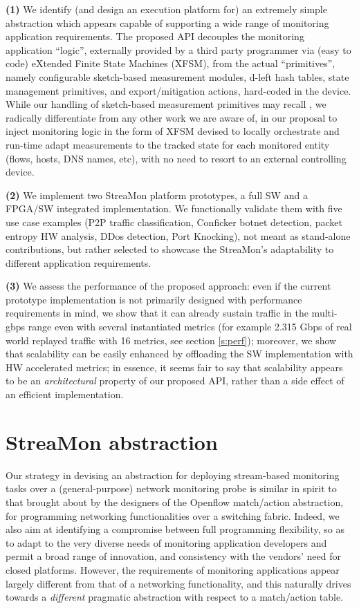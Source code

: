 \documentclass[conference,letterpaper]{sig-alternate-10pt}
\begin{document}
{\bf (1)} We identify (and design an execution platform for) an extremely simple abstraction which appears capable of supporting a wide range of monitoring application requirements. The proposed API decouples the monitoring application ``logic'', externally provided by a third party programmer via (easy to code) eXtended Finite State Machines (XFSM), from the actual ``primitives'', namely configurable sketch-based measurement modules, d-left hash tables, state management primitives, and export/mitigation actions, hard-coded in the device. While our handling of sketch-based measurement primitives may recall \cite{opensk}, we radically differentiate from any other work we are aware of, in our proposal to inject monitoring logic in the form of XFSM devised to locally orchestrate and run-time adapt measurements to the tracked state for each monitored entity (flows, hosts, DNS names, etc),
with no need to resort to an external controlling device.

{\bf (2)} We implement two StreaMon platform prototypes, a full SW and a FPGA/SW integrated implementation. We functionally validate them with five use case examples (P2P traffic classification, Conficker botnet detection, packet entropy HW analysis, DDos detection, Port Knocking), not meant as stand-alone contributions, but rather selected to showcase the StreaMon's adaptability to different application requirements. 

{\bf (3)} We assess the performance of the proposed approach: even if the current prototype implementation is not primarily designed with performance requirements in mind, we show that it can already sustain traffic in the multi-gbps range even with several instantiated metrics (for example 2.315 Gbps of real world replayed traffic with 16 metrics, see section \ref{s:perf}); moreover, we show that scalability can be easily enhanced by offloading the SW implementation with HW accelerated metrics; in essence, it seems fair to say that scalability appears to be an {\em architectural} property of our proposed API, rather than a side effect of an efficient implementation.




\section{StreaMon abstraction}
\label{s:abstraction}

Our strategy in devising an abstraction for deploying stream-based monitoring tasks over a (general-purpose) network monitoring probe is similar in spirit to that brought about by the designers of the Openflow \cite{OF08} match/action abstraction, for programming networking functionalities over a switching fabric. Indeed, we also aim at identifying a compromise between full programming flexibility, so as to adapt to the very diverse needs of monitoring application developers and permit a broad range of innovation, and consistency with the vendors' need for closed platforms. However, the requirements of monitoring applications appear largely different from that of a networking functionality, and this naturally drives towards a {\em different} pragmatic abstraction with respect to a match/action table. 
\end{document}
